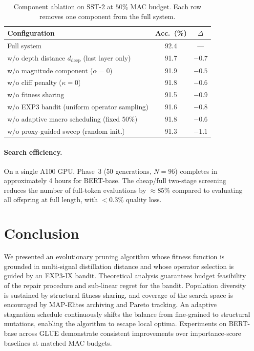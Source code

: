 \documentclass{article}
\newcommand{\ddeep}{d_{\mathrm{deep}}}
\begin{document}
\begin{table}[t]
\centering
\caption{Component ablation on SST-2 at $50\%$ MAC budget.
  Each row removes one component from the full system.}
\label{tab:ablation}
\small
\begin{tabular}{@{}lcc@{}}
\toprule
Configuration & Acc.\ (\%) & $\Delta$\\
\midrule
Full system & 92.4 & ---\\
\midrule
\; w/o depth distance $\ddeep$ (last layer only) & 91.7 & $-0.7$\\
\; w/o magnitude component ($\alpha=0$)          & 91.9 & $-0.5$\\
\; w/o cliff penalty ($\kappa=0$)                & 91.8 & $-0.6$\\
\; w/o fitness sharing                           & 91.5 & $-0.9$\\
\; w/o EXP3 bandit (uniform operator sampling)   & 91.6 & $-0.8$\\
\; w/o adaptive macro scheduling (fixed 50\%)    & 91.8 & $-0.6$\\
\; w/o proxy-guided sweep (random init.)         & 91.3 & $-1.1$\\
\bottomrule
\end{tabular}
\end{table}

\paragraph{Search efficiency.}
On a single A100 GPU, Phase~3 (50 generations, $N=96$) completes in
approximately 4 hours for BERT-base.  The cheap/full two-stage screening
reduces the number of full-token evaluations by $\approx 85\%$ compared
to evaluating all offspring at full length, with $<0.3\%$ quality loss.

\section{Conclusion}
\label{sec:conclusion}

We presented an evolutionary pruning algorithm whose fitness function is
grounded in multi-signal distillation distance and whose operator
selection is guided by an EXP3-IX bandit.  Theoretical analysis
guarantees budget feasibility of the repair procedure and sub-linear
regret for the bandit.  Population diversity is sustained by structural
fitness sharing, and coverage of the search space is encouraged by
MAP-Elites archiving and Pareto tracking.  An adaptive stagnation
schedule continuously shifts the balance from fine-grained to
structural mutations, enabling the algorithm to escape local optima.
Experiments on BERT-base across GLUE demonstrate consistent improvements
over importance-score baselines at matched MAC budgets.
\end{document}
